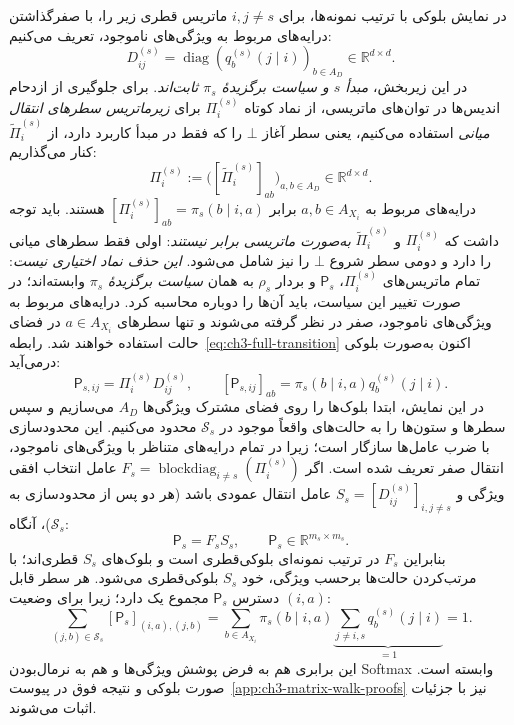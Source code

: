 در نمایش بلوکی با ترتیب نمونه‌ها، برای $i,j\ne s$ ماتریس قطری زیر را، با صفرگذاشتن درایه‌های مربوط به ویژگی‌های ناموجود، تعریف می‌کنیم:
\begin{equation}\label{eq:ch3-block-diagonal-D}
D_{ij}^{(s)}
=\operatorname{diag}\!\left(q_b^{(s)}(j\mid i)\right)_{b\in A_D}
\in\mathbb R^{d\times d}.
\end{equation}
در این زیر‌بخش، \emph{مبدأ $s$ و سیاست برگزیدهٔ $\pi_s$ ثابت‌اند}.
برای جلوگیری از ازدحام اندیس‌ها در توان‌های ماتریسی،
از نماد کوتاه $\Pi_i^{(s)}$ برای
\emph{زیرماتریس سطرهای انتقال میانی} استفاده می‌کنیم،
یعنی سطر آغاز $\bot$ را که فقط در مبدأ کاربرد دارد،
از $\widetilde\Pi_i^{(s)}$ کنار می‌گذاریم:
\[
\Pi_i^{(s)}
:=\bigl([\widetilde\Pi_i^{(s)}]_{ab}\bigr)_{a,b\in A_D}
\in\mathbb R^{d\times d}.
\]
درایه‌های مربوط به $a,b\in A_{X_i}$ برابر
$[\Pi_i^{(s)}]_{ab}=\pi_s(b\mid i,a)$ هستند.
باید توجه داشت که $\Pi_i^{(s)}$ و
$\widetilde\Pi_i^{(s)}$ \emph{به‌صورت ماتریسی برابر نیستند}:
اولی فقط سطرهای میانی را دارد و دومی سطر
شروع $\bot$ را نیز شامل می‌شود.
\emph{این حذف نماد اختیاری نیست}: تمام ماتریس‌های
$\Pi_i^{(s)}$، $\mathsf P_s$ و بردار $\rho_s$
به همان \emph{سیاست برگزیدهٔ} $\pi_s$ وابسته‌اند؛
در صورت تغییر این سیاست، باید آن‌ها را دوباره محاسبه کرد.
درایه‌های مربوط به ویژگی‌های ناموجود، صفر در نظر گرفته
می‌شوند و تنها سطرهای $a\in A_{X_i}$ در فضای حالت
استفاده خواهند شد. رابطه~\eqref{eq:ch3-full-transition}
اکنون به‌صورت بلوکی درمی‌آید:
\begin{equation}\label{eq:ch3-block-Tij}
\boxed{\mathsf P_{s,ij}=\Pi_i^{(s)}D_{ij}^{(s)},\qquad
[\mathsf P_{s,ij}]_{ab}
=\pi_s(b\mid i,a)q_b^{(s)}(j\mid i).}
\end{equation}
در این نمایش، ابتدا بلوک‌ها را روی فضای مشترک ویژگی‌ها
$A_D$ می‌سازیم و سپس سطرها و ستون‌ها را به حالت‌های
واقعاً موجود در $\mathcal S_s$ محدود می‌کنیم.
این محدودسازی با ضرب عامل‌ها سازگار است؛ زیرا در
تمام درایه‌های متناظر با ویژگی‌های ناموجود، انتقال
صفر تعریف شده است.
اگر $F_s=\operatorname{blockdiag}_{i\ne s}(\Pi_i^{(s)})$
عامل انتخاب افقی ویژگی و
$S_s=[D_{ij}^{(s)}]_{i,j\ne s}$
عامل انتقال عمودی باشد (هر دو پس از محدودسازی
به $\mathcal S_s$)، آنگاه:
\begin{equation}\label{eq:ch3-block-factorization}
\boxed{\mathsf P_s=F_sS_s,\qquad
\mathsf P_s\in\mathbb R^{m_s\times m_s}.}
\end{equation}
بنابراین $F_s$ در ترتیب نمونه‌ای بلوکی‌قطری است و بلوک‌های $S_s$ قطری‌اند؛ با مرتب‌کردن حالت‌ها برحسب ویژگی، خود $S_s$ بلوکی‌قطری می‌شود. هر سطر قابل دسترس $\mathsf P_s$ مجموع یک دارد؛
زیرا برای وضعیت $(i,a)$:
\[
\sum_{(j,b)\in\mathcal S_s}[\mathsf P_s]_{(i,a),(j,b)}
=\sum_{b\in A_{X_i}}\pi_s(b\mid i,a)
\underbrace{\sum_{j\ne i,s}q_b^{(s)}(j\mid i)}_{=1}
=1.
\]
این برابری هم به فرض پوشش ویژگی‌ها و هم به
نرمال‌بودن Softmax وابسته است. صورت بلوکی
و نتیجه فوق در پیوست~\ref{app:ch3-matrix-walk-proofs}
نیز با جزئیات اثبات می‌شوند.

